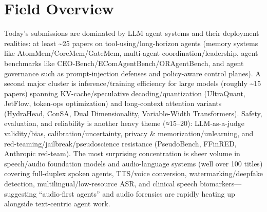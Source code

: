 \documentclass[12pt,letterpaper]{article}
\begin{document}
\section*{Field Overview}
{\footnotesize Today's submissions are dominated by LLM agent systems and their deployment realities: at least \textasciitilde{}25 papers on tool-using/long-horizon agents (memory systems like AtomMem/CoreMem/GateMem, multi-agent coordination/leadership, agent benchmarks like CEO-Bench/EComAgentBench/ORAgentBench, and agent governance such as prompt-injection defenses and policy-aware control planes). A second major cluster is inference/training efficiency for large models (roughly \textasciitilde{}15 papers) spanning KV-cache/speculative decoding/quantization (UltraQuant, JetFlow, token-ops optimization) and long-context attention variants (HydraHead, ConSA, Dual Dimensionality, Variable-Width Transformers). Safety, evaluation, and reliability is another heavy theme (≈15--20): LLM-as-a-judge validity/bias, calibration/uncertainty, privacy \& memorization/unlearning, and red-teaming/jailbreak/pseudoscience resistance (PseudoBench, FFinRED, Anthropic red-team). The most surprising concentration is sheer volume in speech/audio foundation models and audio-language systems (well over 100 titles) covering full-duplex spoken agents, TTS/voice conversion, watermarking/deepfake detection, multilingual/low-resource ASR, and clinical speech biomarkers---suggesting ``audio-first agents'' and audio forensics are rapidly heating up alongside text-centric agent work.}
\end{document}

